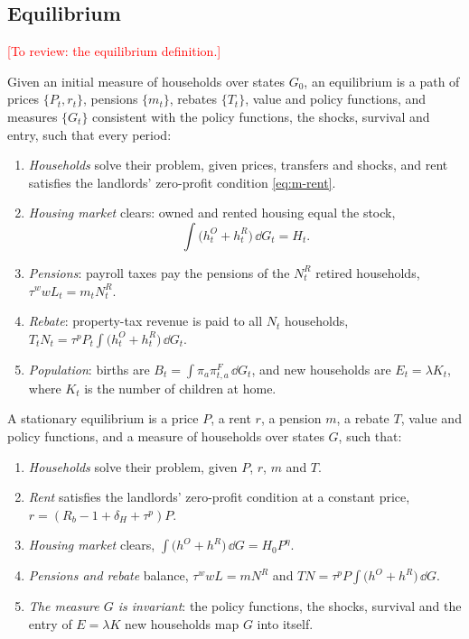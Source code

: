 \subsection{Equilibrium}
\label{sec:m-equilibrium}

\textcolor{red}{[To review: the equilibrium definition.]}

\begin{definition}
Given an initial measure of households over states $G_0$, an equilibrium is
a path of prices $\{P_t,r_t\}$, pensions $\{m_t\}$, rebates $\{T_t\}$, value
and policy functions, and measures $\{G_t\}$ consistent with the policy
functions, the shocks, survival and entry, such that every period:
\begin{enumerate}
\item \emph{Households} solve their problem, given prices, transfers and
shocks, and rent satisfies the landlords' zero-profit condition
\eqref{eq:m-rent}.
\item \emph{Housing market} clears: owned and rented housing equal the stock,
\[
 \int\bigl(h^O_t+h^R_t\bigr)\,\dd G_t=H_t .
\]
\item \emph{Pensions}: payroll taxes pay the pensions of the $N^R_t$ retired
households, $\tau^wwL_t=m_tN^R_t$.
\item \emph{Rebate}: property-tax revenue is paid to all $N_t$ households,
$T_tN_t=\tau^pP_t\int\bigl(h^O_t+h^R_t\bigr)\,\dd G_t$.
\item \emph{Population}: births are $B_t=\int\pi_a\pi^F_{t,a}\,\dd G_t$, and
new households are $E_t=\lambda K_t$, where $K_t$ is the number of children
at home.
\end{enumerate}
\end{definition}

\begin{definition}
A stationary equilibrium is a price $P$, a rent $r$, a pension $m$, a rebate
$T$, value and policy functions, and a measure of households over states
$G$, such that:
\begin{enumerate}
\item \emph{Households} solve their problem, given $P$, $r$, $m$ and $T$.
\item \emph{Rent} satisfies the landlords' zero-profit condition at a
constant price, $r=(R_b-1+\delta_H+\tau^p)P$.
\item \emph{Housing market} clears,
$\int\bigl(h^O+h^R\bigr)\,\dd G=H_0P^{\eta}$.
\item \emph{Pensions and rebate} balance, $\tau^wwL=mN^R$ and
$TN=\tau^pP\int\bigl(h^O+h^R\bigr)\,\dd G$.
\item \emph{The measure $G$ is invariant}: the policy functions, the shocks,
survival and the entry of $E=\lambda K$ new households map $G$ into itself.
\end{enumerate}
\end{definition}

